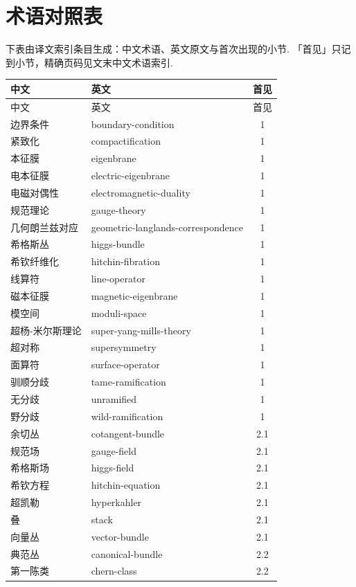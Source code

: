 \section{术语对照表}
\label{app:glossary}
\noindent 下表由译文索引条目生成：中文术语、英文原文与首次出现的小节. 「首见」只记到小节，精确页码见文末中文术语索引.
\begin{longtable}{p{}p{}c}
\toprule
中文 & 英文 & 首见\\
\midrule
\endfirsthead
\toprule
中文 & 英文 & 首见\\
\midrule
\endhead
\bottomrule
\endfoot
边界条件 & boundary-condition & 1\\
紧致化 & compactification & 1\\
本征膜 & eigenbrane & 1\\
电本征膜 & electric-eigenbrane & 1\\
电磁对偶性 & electromagnetic-duality & 1\\
规范理论 & gauge-theory & 1\\
几何朗兰兹对应 & geometric-langlands-correspondence & 1\\
希格斯丛 & higgs-bundle & 1\\
希钦纤维化 & hitchin-fibration & 1\\
线算符 & line-operator & 1\\
磁本征膜 & magnetic-eigenbrane & 1\\
模空间 & moduli-space & 1\\
超杨-米尔斯理论 & super-yang-mills-theory & 1\\
超对称 & supersymmetry & 1\\
面算符 & surface-operator & 1\\
驯顺分歧 & tame-ramification & 1\\
无分歧 & unramified & 1\\
野分歧 & wild-ramification & 1\\
余切丛 & cotangent-bundle & 2.1\\
规范场 & gauge-field & 2.1\\
希格斯场 & higgs-field & 2.1\\
希钦方程 & hitchin-equation & 2.1\\
超凯勒 & hyperkahler & 2.1\\
叠 & stack & 2.1\\
向量丛 & vector-bundle & 2.1\\
典范丛 & canonical-bundle & 2.2\\
第一陈类 & chern-class & 2.2\\

\end{longtable}
